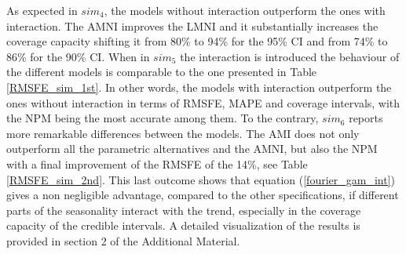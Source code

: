 \documentclass{article}\usepackage[]{graphicx}\usepackage[]{color}
\begin{document}
As expected in $ sim_4 $, the models without interaction outperform the ones with interaction. The AMNI improves the LMNI and it substantially increases the coverage capacity shifting it from 80\% to 94\% for the 95\% CI and from 74\% to 86\% for the 90\% CI.  
When in $sim_5$ the interaction is introduced the behaviour of the different models is comparable to the one presented in Table \ref{RMSFE_sim_1st}. In other words, the models with interaction outperform the ones without interaction in terms of RMSFE, MAPE and coverage intervals, with the NPM being the most accurate among them. 
To the contrary, $sim_6$ reports more remarkable differences between the models. The AMI does not only outperform all the parametric alternatives and the AMNI, but also the NPM with a final improvement of the RMSFE of the 14\%, see Table \ref{RMSFE_sim_2nd}. This last outcome shows that equation (\ref{fourier_gam_int}) gives a non negligible advantage, compared to the other specifications, if different parts of the seasonality interact with the trend, especially in the coverage capacity of the credible intervals. 
A detailed visualization of the results is provided in section 2 of the Additional Material.
\end{document}
